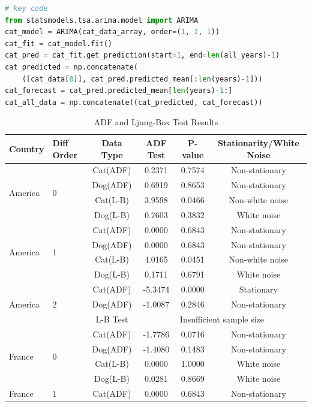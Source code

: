 \documentclass[withoutpreface,bwprint]{cumcmthesis} %
\begin{document}
\begin{lstlisting}[language=python]
# key code
from statsmodels.tsa.arima.model import ARIMA
cat_model = ARIMA(cat_data_array, order=(1, 1, 1))
cat_fit = cat_model.fit()
cat_pred = cat_fit.get_prediction(start=1, end=len(all_years)-1)
cat_predicted = np.concatenate(
    ([cat_data[0]], cat_pred.predicted_mean[:len(years)-1]))
cat_forecast = cat_pred.predicted_mean[len(years)-1:]
cat_all_data = np.concatenate((cat_predicted, cat_forecast))
\end{lstlisting}

\clearpage
\begin{table}[htbp]
\small %
\centering
\caption{ADF and Ljung-Box Test Results}
\begin{tabular}{llcccc}
\toprule
Country & Diff Order & Data Type & ADF Test & P-value & Stationarity/White Noise \\
\midrule
\multirow{4}{*}{America} & \multirow{4}{*}{0} & Cat(ADF) & 0.2371 & 0.7574 & Non-stationary \\
& & Dog(ADF) & 0.6919 & 0.8653 & Non-stationary \\
& & Cat(L-B) & 3.9598 & 0.0466 & Non-white noise \\
& & Dog(L-B) & 0.7603 & 0.3832 & White noise \\
\midrule
\multirow{4}{*}{America} & \multirow{4}{*}{1} & Cat(ADF) & 0.0000 & 0.6843 & Non-stationary \\
& & Dog(ADF) & 0.0000 & 0.6843 & Non-stationary \\
& & Cat(L-B) & 4.0165 & 0.0451 & Non-white noise \\
& & Dog(L-B) & 0.1711 & 0.6791 & White noise \\
\midrule
\multirow{3}{*}{America} & \multirow{3}{*}{2} & Cat(ADF) & -5.3474 & 0.0000 & Stationary \\
& & Dog(ADF) & -1.0087 & 0.2846 & Non-stationary \\
& & L-B Test & \multicolumn{3}{c}{Insufficient sample size} \\
\midrule
\multirow{4}{*}{France} & \multirow{4}{*}{0} & Cat(ADF) & -1.7786 & 0.0716 & Non-stationary \\
& & Dog(ADF) & -1.4080 & 0.1483 & Non-stationary \\
& & Cat(L-B) & 0.0000 & 1.0000 & White noise \\
& & Dog(L-B) & 0.0281 & 0.8669 & White noise \\
\midrule
\multirow{4}{*}{France} & \multirow{4}{*}{1} & Cat(ADF) & 0.0000 & 0.6843 & Non-stationary \\

\end{tabular}
\end{table}
\end{document}
